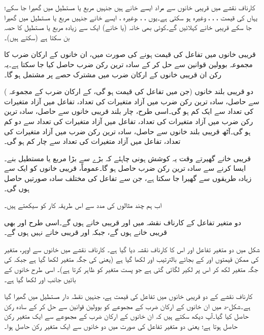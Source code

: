 کارناف نقشے میں قریبی خانوں سے مراد ایسے  خانے ہیں جنہیں مربع یا مستطیل میں گھیرا جا سکے؛ یہاں  کی قیمت ، ، ، وغیرہ ہو سکتی ہے۔یوں ، ، ،وغیرہ ، ایسے خانے جنہیں مربع یا مستطیل میں گھیرا جا سکے قریبی خانے کہلائیں گے۔کوئی بھی خانہ (یا خانے) ایک سے زیادہ مربع یا مستطیل کا حصہ بن سکتا ہے (سکتے ہیں)۔

قریبی خانوں میں تفاعل کی قیمت  ہونے کی صورت میں، ان خانوں کے ارکان ضرب کا مجموعہ بوولین قوانین سے حل کر کے سادہ ترین رکن ضرب حاصل کیا جا سکتا ہے۔یہ رکن ان قریبی خانوں کے ارکان ضرب میں مشترک حصے پر مشتمل ہو گا۔

دو قریبی بلند خانوں (جن میں تفاعل کی قیمت  ہو گی، کے ارکان ضرب کے مجموعہ ) سے حاصل، سادہ ترین رکن ضرب میں آزاد متغیرات کی تعداد، تفاعل میں آزاد متغیرات کی تعداد سے ایک کم ہو گی۔اسی طرح، چار بلند قریبی خانوں سے حاصل، سادہ ترین رکن ضرب میں آزاد متغیرات کی تعداد، تفاعل میں آزاد متغیرات کی تعداد سے دو کم ہو گی۔آٹھ قریبی بلند خانوں سے حاصل، سادہ ترین رکن ضرب میں آزاد متغیرات کی تعداد، تفاعل میں آزاد متغیرات کی تعداد سے چار کم ہو گی۔
	
قریبی خانے گھیرتے وقت یہ کوشش ہونی چاہئے کہ بڑے سے بڑا مربع یا مستطیل بنے۔ایسا کرنے سے سادہ ترین رکن ضرب حاصل ہو گا۔عموماً، قریبی خانوں کو ایک سے زیادہ طریقوں سے گھیرا جا سکتا ہے، جن سے تفاعل کی مختلف سادہ صورتیں حاصل ہوں گی۔
	
اب ہم چند مثالوں کی مدد سے اس طریقہ کار کو سیکھتے ہیں۔
	

دو متغیر تفاعل کے کارناف نقشہ میں  اور  قریبی خانے ہوں گے۔اسی طرح  اور  بھی قریبی خانے ہوں گے، جبکہ  اور  قریبی خانے نہیں ہوں گے۔

شکل  میں دو متغیر تفاعل اور اس کا کارناف نقشہ دیا گیا ہے۔ کارناف نقشے میں خانوں سے اوپر، متغیر  کی ممکن قیمتوں  اور  کے بجائے بالترتیب  اور  لکھا گیا ہے (یعنی  کی جگہ متغیر لکھا گیا ہے جبکہ  کی جگہ متغیر لکھ کر اس پر لکیر لگائی گئی ہے جو پست متغیر کو ظاہر کرتا ہے)۔ اسی طرح خانوں کے بائیں جانب  اور  لکھا گیا ہے۔

 کارناف نقشے کے دو قریبی خانوں میں تفاعل کی قیمت  ہے، جنہیں نقطہ دار مستطیل میں گھیرا گیا ہے۔شکل-د میں ان خانوں کے ارکان ضرب کے مجموعے کو بوولین قوانین سے حل کر کے سادہ رکن حاصل کیا گیا۔آپ دیکھ سکتے ہیں کہ ان خانوں کے ارکان ضرب کے مجموعے سے ایک متغیر رکن حاصل ہوتا ہے؛ یعنی دو متغیر تفاعل کی صورت میں دو خانوں سے ایک متغیر رکن حاصل ہوا۔

